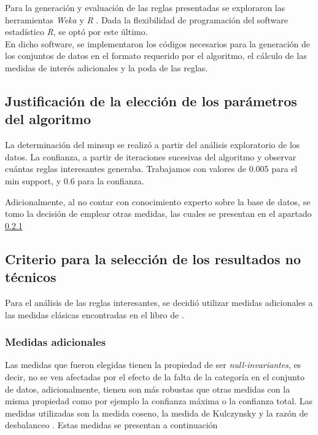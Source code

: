 \documentclass[]{article}
\begin{document}
	Para la generación y evaluación de las reglas presentadas se exploraron las herramientas \textit{Weka} \cite{Weka1} y \textit{R} \cite{RCran}. Dada la flexibilidad de programación del software estadístico \textit{R}, se optó por este último.\\
	
	En dicho software, se implementaron los códigos necesarios para la generación de los conjuntos de datos en el formato requerido por el algoritmo, el cálculo de las medidas de interés adicionales y la poda de las reglas.
	
	\subsection{Justificación de la elección de los parámetros del algoritmo}
	La determinación del minsup se realizó a partir del análisis exploratorio de los datos. La confianza, a partir de iteraciones sucesivas del algoritmo y observar cuántas reglas interesantes generaba. Trabajamos con valores de 0.005 para el min support, y 0.6 para la confianza.%
	
	Adicionalmente, al no contar con conocimiento experto sobre la base de datos, se tomo la decisión de emplear otras medidas, las cuales se presentan en el apartado \ref{Medidas} 
	
	\subsection{Criterio para la selección de los resultados no técnicos}
	
	Para el análisis de las reglas interesantes, se decidió utilizar medidas adicionales a las medidas clásicas encontradas en el libro de \cite{Tan:2005:IDM:1095618}.
	
	\subsubsection{Medidas adicionales} \label{Medidas}
	Las medidas que fueron elegidas tienen la propiedad de ser \textit{null-invariantes}, es decir, no se ven afectadas por el efecto de la falta de la categoría en el conjunto de datos, adicionalmente, tienen son más robustas que otras medidas con la misma propiedad como por ejemplo la confianza máxima o la confianza total. Las medidas utilizadas son la medida coseno, la medida de Kulczynsky y la razón de desbalanceo \cite{Hall:2009:WDM:1656274.1656278}. Estas medidas se presentan a continuación\\
	
\end{document}
